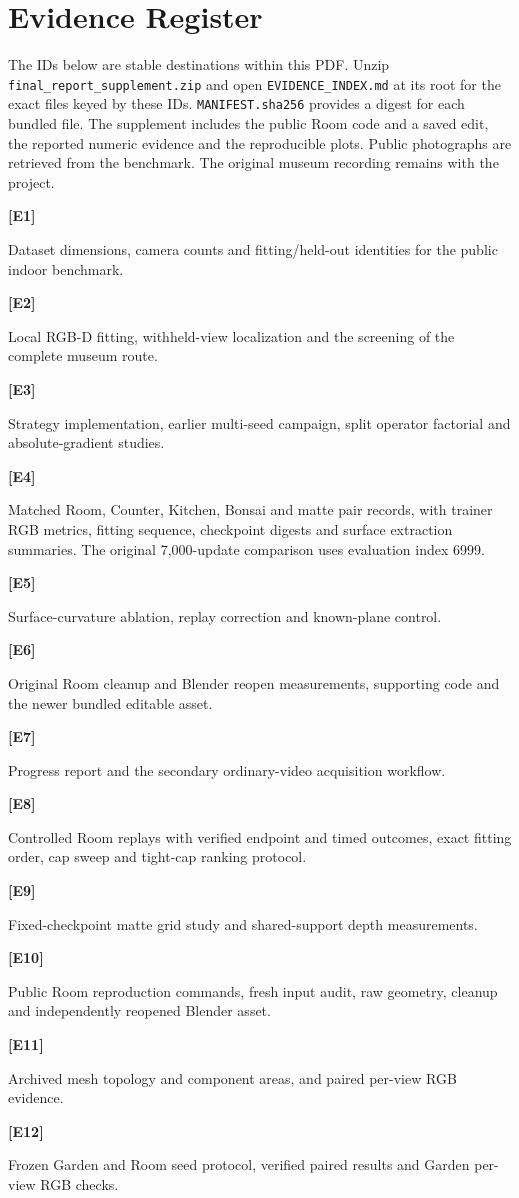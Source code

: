 \section*{Evidence Register}
The IDs below are stable destinations within this PDF. Unzip \texttt{final\_report\_supplement.zip} and open \texttt{EVIDENCE\_INDEX.md} at its root for the exact files keyed by these IDs. \texttt{MANIFEST.sha256} provides a digest for each bundled file. The supplement includes the public Room code and a saved edit, the reported numeric evidence and the reproducible plots. Public photographs are retrieved from the benchmark. The original museum recording remains with the project.

\hypertarget{evE1}{\textbf{[E1]}} Dataset dimensions, camera counts and fitting/held-out identities for the public indoor benchmark.

\hypertarget{evE2}{\textbf{[E2]}} Local RGB-D fitting, withheld-view localization and the screening of the complete museum route.

\hypertarget{evE3}{\textbf{[E3]}} Strategy implementation, earlier multi-seed campaign, split operator factorial and absolute-gradient studies.

\hypertarget{evE4}{\textbf{[E4]}} Matched Room, Counter, Kitchen, Bonsai and matte pair records, with trainer RGB metrics, fitting sequence, checkpoint digests and surface extraction summaries. The original 7,000-update comparison uses evaluation index 6999.

\hypertarget{evE5}{\textbf{[E5]}} Surface-curvature ablation, replay correction and known-plane control.

\hypertarget{evE6}{\textbf{[E6]}} Original Room cleanup and Blender reopen measurements, supporting code and the newer bundled editable asset.

\hypertarget{evE7}{\textbf{[E7]}} Progress report and the secondary ordinary-video acquisition workflow.

\hypertarget{evE8}{\textbf{[E8]}} Controlled Room replays with verified endpoint and timed outcomes, exact fitting order, cap sweep and tight-cap ranking protocol.

\hypertarget{evE9}{\textbf{[E9]}} Fixed-checkpoint matte grid study and shared-support depth measurements.

\hypertarget{evE10}{\textbf{[E10]}} Public Room reproduction commands, fresh input audit, raw geometry, cleanup and independently reopened Blender asset.

\hypertarget{evE11}{\textbf{[E11]}} Archived mesh topology and component areas, and paired per-view RGB evidence.

\hypertarget{evE12}{\textbf{[E12]}} Frozen Garden and Room seed protocol, verified paired results and Garden per-view RGB checks.
